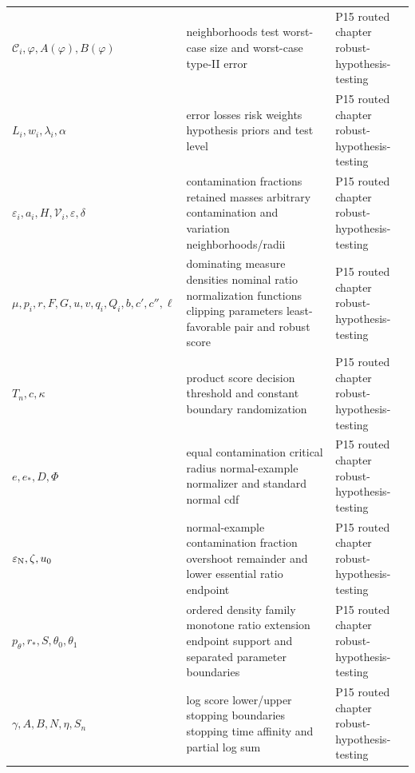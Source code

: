 \begin{longtable}{@{}p{}p{}p{}@{}}
\(\mathcal C_i,\allowbreak \varphi,\allowbreak A(\varphi),\allowbreak B(\varphi)\) & neighborhoods test worst-case size and worst-case type-II error & P15 routed chapter robust-\allowbreak{}hypothesis-\allowbreak{}testing \\
\(L_i,\allowbreak w_i,\allowbreak \lambda_i,\allowbreak \alpha\) & error losses risk weights hypothesis priors and test level & P15 routed chapter robust-\allowbreak{}hypothesis-\allowbreak{}testing \\
\(\varepsilon_i,\allowbreak a_i,\allowbreak H,\allowbreak \mathcal V_i,\allowbreak \varepsilon,\allowbreak \delta\) & contamination fractions retained masses arbitrary contamination and variation neighborhoods/radii & P15 routed chapter robust-\allowbreak{}hypothesis-\allowbreak{}testing \\
\(\mu,\allowbreak p_i,\allowbreak r,\allowbreak F,\allowbreak G,\allowbreak u,\allowbreak v,\allowbreak q_i,\allowbreak Q_i,\allowbreak b,\allowbreak c',\allowbreak c'',\allowbreak \ell\) & dominating measure densities nominal ratio normalization functions clipping parameters least-favorable pair and robust score & P15 routed chapter robust-\allowbreak{}hypothesis-\allowbreak{}testing \\
\(T_n,\allowbreak c,\allowbreak \kappa\) & product score decision threshold and constant boundary randomization & P15 routed chapter robust-\allowbreak{}hypothesis-\allowbreak{}testing \\
\(e,\allowbreak e_*,\allowbreak D,\allowbreak \Phi\) & equal contamination critical radius normal-example normalizer and standard normal cdf & P15 routed chapter robust-\allowbreak{}hypothesis-\allowbreak{}testing \\
\(\varepsilon_{\rm N},\allowbreak \zeta,\allowbreak u_0\) & normal-example contamination fraction overshoot remainder and lower essential ratio endpoint & P15 routed chapter robust-\allowbreak{}hypothesis-\allowbreak{}testing \\
\(p_\theta,\allowbreak r_*,\allowbreak S,\allowbreak \theta_0,\allowbreak \theta_1\) & ordered density family monotone ratio extension endpoint support and separated parameter boundaries & P15 routed chapter robust-\allowbreak{}hypothesis-\allowbreak{}testing \\
\(\gamma,\allowbreak A,\allowbreak B,\allowbreak N,\allowbreak \eta,\allowbreak S_n\) & log score lower/upper stopping boundaries stopping time affinity and partial log sum & P15 routed chapter robust-\allowbreak{}hypothesis-\allowbreak{}testing \\

\end{longtable}
